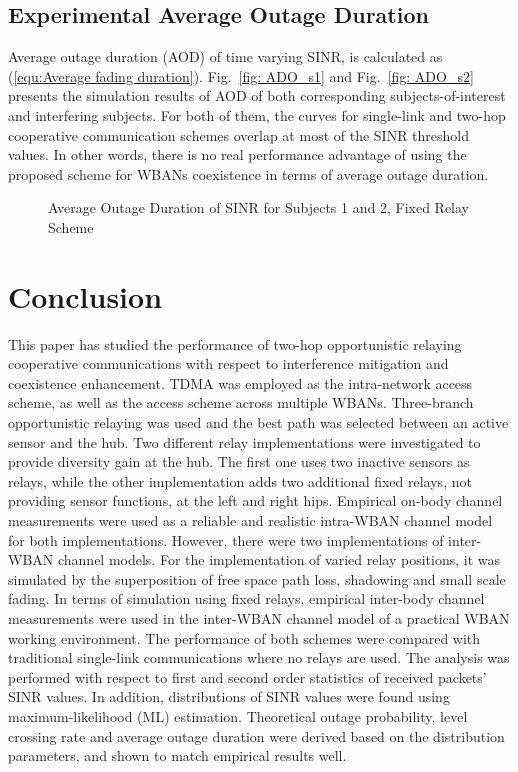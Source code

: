 \documentclass[12pt,draftcls,a4paper,onecolumn,journal]{IEEEtran}
\begin{document}
\subsection{Experimental Average Outage Duration}
Average outage duration (AOD) of time varying SINR, is calculated as (\ref{equ:Average fading duration}). Fig.~\ref{fig: ADO_s1} and Fig.~\ref{fig: ADO_s2} presents the simulation results of AOD of both corresponding subjects-of-interest and interfering subjects. For both of them, the curves for single-link and two-hop cooperative communication schemes overlap at most of the SINR threshold values. In other words, there is no real performance advantage of using the proposed scheme for WBANs coexistence in terms of average outage duration.

\begin{figure}[]
\centering
{}
\caption{Average Outage Duration of SINR for Subjects 1 and 2,  Fixed Relay Scheme}
\label{fig:average outage duration}
\end{figure}

\section{Conclusion}
This paper has studied the performance of two-hop opportunistic relaying cooperative communications with respect to interference mitigation and coexistence enhancement. TDMA was employed as the intra-network access scheme, as well as the access scheme across multiple WBANs. Three-branch opportunistic relaying was used and the best path was selected between an active sensor and the hub. Two different relay implementations were investigated to provide diversity gain at the hub. The first one uses two inactive sensors as relays, while the other implementation adds two additional fixed relays, not providing sensor functions, at the left and right hips. Empirical on-body channel measurements were used as a reliable and realistic intra-WBAN channel model for both implementations. However, there were two implementations of inter-WBAN channel models. For the implementation of varied relay positions, it was simulated by the superposition of free space path loss, shadowing and small scale fading. In terms of simulation using fixed relays, empirical inter-body channel measurements were used in the inter-WBAN channel model of a practical WBAN working environment. The performance of both schemes were compared with traditional single-link communications where no relays are used. The analysis was performed with respect to first and second order statistics of received packets' SINR values. In addition, distributions of SINR values were found using maximum-likelihood (ML) estimation. Theoretical outage probability, level crossing rate and average outage duration were derived based on the distribution parameters, and shown to match empirical results well.
\end{document}
